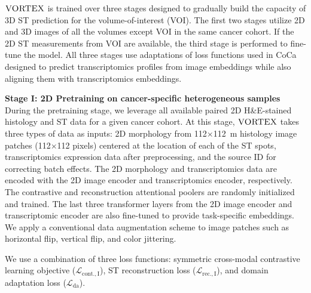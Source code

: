 $\textsc{VORTEX}$  is trained over three stages designed to gradually build the capacity of 3D ST prediction for the volume-of-interest (VOI). The first two stages utilize 2D and 3D images of all the volumes except VOI in the same cancer cohort. If the 2D ST measurements from VOI are available, the third stage is performed to fine-tune the model. All three stages use adaptations of loss functions used in CoCa\cite{yu2022coca} designed to predict transcriptomics profiles from image embeddings while also aligning them with transcriptomics embeddings.

\noindent\textbf{Stage I: 2D Pretraining on cancer-specific heterogeneous samples} During the pretraining stage, we leverage all available paired 2D H\&E-stained histology and ST data for a given cancer cohort. At this stage, $\textsc{VORTEX}$ takes three types of data as inputs: 2D morphology from 112$\times$112~\textmu m histology image patches (112$\times$112 pixels) centered at the location of each of the ST spots, transcriptomics expression data after preprocessing, and the source ID for correcting batch effects. The 2D morphology and transcriptomics data are encoded with the 2D image encoder and transcriptomics encoder, respectively. The contrastive and reconstruction attentional poolers are randomly initialized and trained. The last three transformer layers from the 2D image encoder and transcriptomic encoder are also fine-tuned to provide task-specific embeddings. We apply a conventional data augmentation scheme to image patches such as horizontal flip, vertical flip, and color jittering. 

We use a combination of three loss functions: symmetric cross-modal contrastive learning objective ($\mathcal{L}_{\text{cont.}, \mathrm{I}}$), ST reconstruction loss ($\mathcal{L}_{\text{rec.},\mathrm{I}}$), and domain adaptation loss ($\mathcal{L}_{\text{da}}$).

